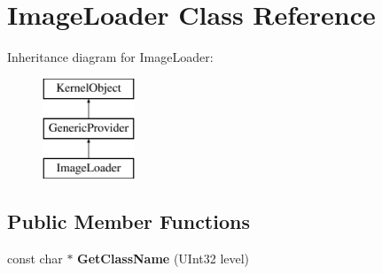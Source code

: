 \hypertarget{class_image_loader}{}\section{Image\+Loader Class Reference}
\label{class_image_loader}
Inheritance diagram for Image\+Loader\+:\begin{figure}[H]
\begin{center}
\leavevmode
\includegraphics[height=3.000000cm]{class_image_loader}
\end{center}
\end{figure}
\subsection*{Public Member Functions}
\begin{DoxyCompactItemize}
\item 
\mbox{\label{class_image_loader_a90f79b71b80f026c0a0c8b8da07b9d23}} 
const char $\ast$ {\bfseries Get\+Class\+Name} (U\+Int32 level)
\end{DoxyCompactItemize}
